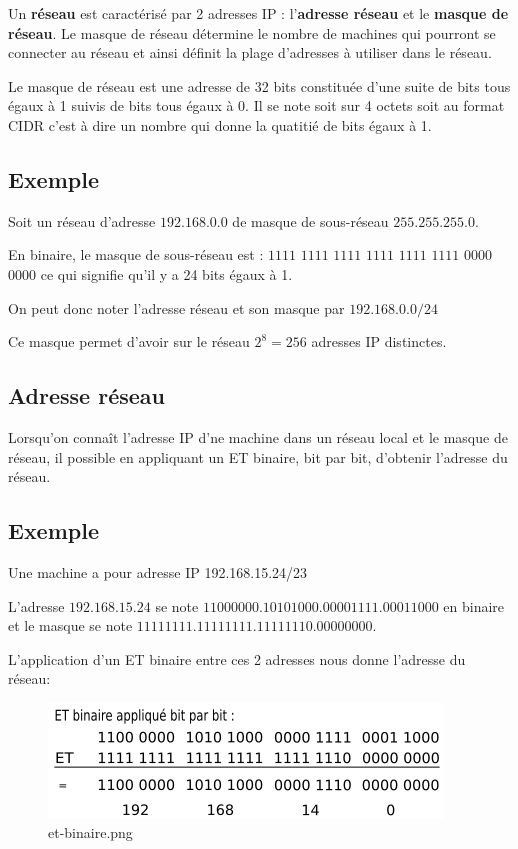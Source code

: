 \documentclass[11pt]{article}
\begin{document}
Un \textbf{réseau} est caractérisé par 2 adresses IP : l'\textbf{adresse
réseau} et le \textbf{masque de réseau}. Le masque de réseau détermine
le nombre de machines qui pourront se connecter au réseau et ainsi
définit la plage d'adresses à utiliser dans le réseau.

Le masque de réseau est une adresse de 32 bits constituée d'une suite de
bits tous égaux à 1 suivis de bits tous égaux à 0. Il se note soit sur 4
octets soit au format CIDR c'est à dire un nombre qui donne la quatitié
de bits égaux à 1.

\hypertarget{exemple}{%
\subsection{Exemple}\label{exemple}}

Soit un réseau d'adresse \(192.168.0.0\) de masque de sous-réseau
\(255.255.255.0\).

En binaire, le masque de sous-réseau est : \(1111\) \(1111\) \(1111\)
\(1111\) \(1111\) \(1111\) \(0000\) \(0000\) ce qui signifie qu'il y a
24 bits égaux à 1.

On peut donc noter l'adresse réseau et son masque par \(192.168.0.0/24\)

Ce masque permet d'avoir sur le réseau \(2^{8}=256\) adresses IP
distinctes.

    \hypertarget{adresse-ruxe9seau}{%
\subsection{Adresse réseau}\label{adresse-ruxe9seau}}

Lorsqu'on connaît l'adresse IP d'ne machine dans un réseau local et le
masque de réseau, il possible en appliquant un ET binaire, bit par bit,
d'obtenir l'adresse du réseau.

\hypertarget{exemple}{%
\subsection{Exemple}\label{exemple}}

Une machine a pour adresse IP 192.168.15.24/23

L'adresse \(192.168.15.24\) se note
\(1100 0000.1010 1000.0000 1111.0001 1000\) en binaire et le masque se
note \(1111 1111.1111 1111.1111 1110.0000 0000\).

L'application d'un ET binaire entre ces 2 adresses nous donne l'adresse
du réseau:

    \begin{figure}
\centering
\includegraphics{img/et-binaire.png}
\caption{et-binaire.png}
\end{figure}
\end{document}
